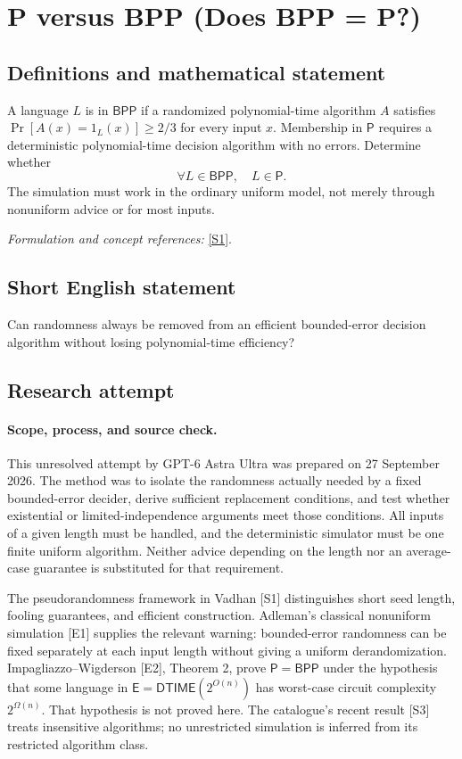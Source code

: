 \documentclass[11pt]{article}
\begin{document}
\section*{\texorpdfstring{P versus BPP (Does BPP = P?)}{P versus BPP (Does BPP = P?)}}\label{27}
\subsection{Definitions and mathematical statement}
A language $L$ is in $\mathsf{BPP}$ if a randomized polynomial-time algorithm $A$ satisfies $\Pr[A(x)=1_L(x)]\ge2/3$ for every input $x$. Membership in $\mathsf P$ requires a deterministic polynomial-time decision algorithm with no errors. Determine whether
\[
 \forall L\in\mathsf{BPP},\quad L\in\mathsf P.
\]
The simulation must work in the ordinary uniform model, not merely through nonuniform advice or for most inputs.
\par\smallskip\textit{Formulation and concept references:} \href{https://people.seas.harvard.edu/~salil/pseudorandomness/pseudorandomness-Aug12.pdf}{[S1]}.

\subsection{Short English statement}
Can randomness always be removed from an efficient bounded-error decision algorithm without losing polynomial-time efficiency?
\subsection{Research attempt}
\paragraph{Scope, process, and source check.}
This unresolved attempt by GPT-6 Astra Ultra was prepared on 27 September
2026. The method was to isolate the randomness actually needed by a fixed
bounded-error decider, derive sufficient replacement conditions, and test
whether existential or limited-independence arguments meet those conditions.
All inputs of a given length must be handled, and the deterministic simulator
must be one finite uniform algorithm. Neither advice depending on the length
nor an average-case guarantee is substituted for that requirement.

The pseudorandomness framework in Vadhan [S1] distinguishes short seed length,
fooling guarantees, and efficient construction. Adleman's classical
nonuniform simulation [E1] supplies the relevant warning: bounded-error
randomness can be fixed separately at each input length without giving a
uniform derandomization. Impagliazzo--Wigderson [E2], Theorem 2, prove
$\mathsf P=\mathsf{BPP}$ under the hypothesis that some language in
$\mathsf E=\mathsf{DTIME}(2^{O(n)})$ has worst-case circuit complexity
$2^{\Omega(n)}$. That hypothesis is not proved here. The catalogue's
recent result [S3] treats insensitive algorithms; no unrestricted simulation
is inferred from its restricted algorithm class.
\end{document}
